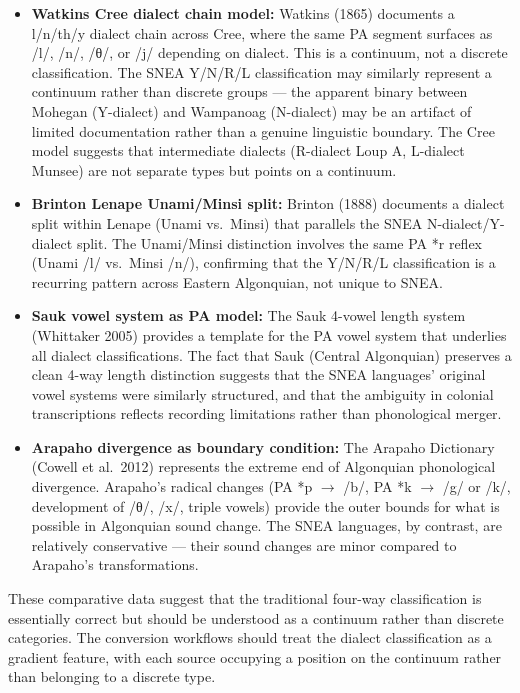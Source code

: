 \begin{itemize}
  \item \textbf{Watkins Cree dialect chain model:} Watkins (1865) documents
    a l/n/th/y dialect chain across Cree, where the same PA segment surfaces
    as /l/, /n/, /θ/, or /j/ depending on dialect. This is a continuum, not a
    discrete classification. The SNEA Y/N/R/L classification may similarly
    represent a continuum rather than discrete groups --- the apparent
    binary between Mohegan (Y-dialect) and Wampanoag (N-dialect) may be an
    artifact of limited documentation rather than a genuine linguistic
    boundary. The Cree model suggests that intermediate dialects (R-dialect
    Loup A, L-dialect Munsee) are not separate types but points on a
    continuum.

  \item \textbf{Brinton Lenape Unami/Minsi split:} Brinton (1888) documents
    a dialect split within Lenape (Unami vs.\ Minsi) that parallels the
    SNEA N-dialect/Y-dialect split. The Unami/Minsi distinction involves the
    same PA *r reflex (Unami /l/ vs.\ Minsi /n/), confirming that the
    Y/N/R/L classification is a recurring pattern across Eastern Algonquian,
    not unique to SNEA.

  \item \textbf{Sauk vowel system as PA model:} The Sauk 4-vowel length
    system (Whittaker 2005) provides a template for the PA vowel system that
    underlies all dialect classifications. The fact that Sauk (Central
    Algonquian) preserves a clean 4-way length distinction suggests that
    the SNEA languages' original vowel systems were similarly structured,
    and that the ambiguity in colonial transcriptions reflects recording
    limitations rather than phonological merger.

  \item \textbf{Arapaho divergence as boundary condition:} The Arapaho
    Dictionary (Cowell et al.\ 2012) represents the extreme end of Algonquian
    phonological divergence. Arapaho's radical changes (PA *p $\rightarrow$
    /b/, PA *k $\rightarrow$ /g/ or /k/, development of /θ/, /x/, triple
    vowels) provide the outer bounds for what is possible in Algonquian sound
    change. The SNEA languages, by contrast, are relatively conservative ---
    their sound changes are minor compared to Arapaho's transformations.
\end{itemize}

These comparative data suggest that the traditional four-way classification
is essentially correct but should be understood as a continuum rather than
discrete categories. The conversion workflows should treat the dialect
classification as a gradient feature, with each source occupying a position
on the continuum rather than belonging to a discrete type.
